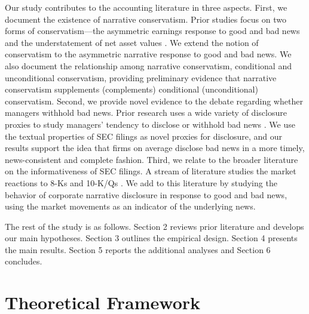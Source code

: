 \documentclass[letterpaper,12pt]{article}
\begin{document}
\begin{spacing}{1.5}
Our study contributes to the accounting literature in three aspects. First, we document the existence of narrative conservatism. Prior studies focus on two forms of conservatism---the asymmetric earnings response to good and bad news and the understatement of net asset values \cite{basuConservatismPrincipleAsymmetric1997, ballEarningsQualityUK2005, beaverConditionalUnconditionalConservatism2005}. We extend the notion of conservatism to the asymmetric narrative response to good and bad news. We also document the relationship among narrative conservatism, conditional and unconditional conservatism, providing preliminary evidence that narrative conservatism supplements (complements) conditional (unconditional) conservatism.
Second, we provide novel evidence to the debate regarding whether managers withhold bad news. Prior research uses a wide variety of disclosure proxies to study managers' tendency to disclose or withhold bad news \cite{kasznikWarnNotWarn1995, kothariManagersWithholdBad2009, baoManagersDiscloseWithhold2019}. We use the textual properties of SEC filings as novel proxies for disclosure, and our results support the idea that firms on average disclose bad news in a more timely, news-consistent and complete fashion. Third, we relate to the broader literature on the informativeness of SEC filings. A stream of literature studies the market reactions to 8-Ks \cite{carterRelevanceForm8K1999, pinskerHasFirmsForm2006, lermanNewForm8K2010} and 10-K/Qs \cite{alfordExtensionsViolationsStatutory1994, liAnnualReportReadability2008, liInformationContentForwardLooking2010}. We add to this literature by studying the behavior of corporate narrative disclosure in response to good and bad news, using the market movements as an indicator of the underlying news.

The rest of the study is as follows. Section 2 reviews prior literature and develops our main hypotheses. Section 3 outlines the empirical design. Section 4 presents the main results. Section 5 reports the additional analyses and Section 6 concludes.

\section{Theoretical Framework}

\end{spacing}
\end{document}
